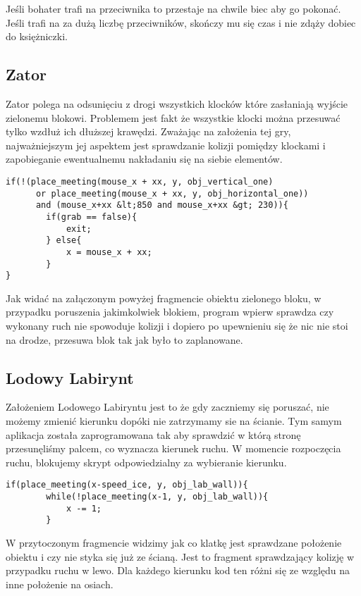 \documentclass[openright]{xmgr}
\begin{document}
Jeśli bohater trafi na przeciwnika to przestaje na chwile biec aby go pokonać. Jeśli trafi na za dużą liczbę przeciwników, skończy mu się czas i nie zdąży dobiec do księżniczki.

\subsection{Zator}
Zator polega na odsunięciu z drogi wszystkich klocków które zasłaniają wyjście zielonemu blokowi. Problemem jest fakt że wszystkie klocki można przesuwać tylko wzdłuż ich dłuższej krawędzi. Zważając na założenia tej gry, najważniejszym jej aspektem jest sprawdzanie kolizji pomiędzy klockami i zapobieganie ewentualnemu nakładaniu się na siebie elementów. 

\begin{lstlisting}[caption={Fragment kodu obiektu obj\_green\_one}]
if(!(place_meeting(mouse_x + xx, y, obj_vertical_one)
      or place_meeting(mouse_x + xx, y, obj_horizontal_one)) 
      and (mouse_x+xx &lt;850 and mouse_x+xx &gt; 230)){
        if(grab == false){
            exit;
        } else{
            x = mouse_x + xx;
        }    
}
\end{lstlisting}

Jak widać na załączonym powyżej fragmencie obiektu zielonego bloku, w przypadku poruszenia jakimkolwiek blokiem, program wpierw sprawdza czy wykonany ruch nie spowoduje kolizji i dopiero po upewnieniu się że nic nie stoi na drodze, przesuwa blok tak jak było to zaplanowane.


\subsection{Lodowy Labirynt}
Założeniem Lodowego Labiryntu jest to że gdy zaczniemy się poruszać, nie możemy zmienić kierunku dopóki nie zatrzymamy sie na ścianie. Tym samym aplikacja została zaprogramowana tak aby sprawdzić w którą stronę przesunęliśmy palcem, co wyznacza kierunek ruchu. W momencie rozpoczęcia ruchu, blokujemy skrypt odpowiedzialny za wybieranie kierunku.

\begin{lstlisting}[caption={Fragment kodu obiektu obj\_player\_ice}]
    if(place_meeting(x-speed_ice, y, obj_lab_wall)){
        while(!place_meeting(x-1, y, obj_lab_wall)){
            x -= 1;
        }
\end{lstlisting}

W przytoczonym fragmencie widzimy jak co klatkę jest sprawdzane położenie obiektu i czy nie styka się już ze ścianą. Jest to fragment sprawdzający kolizję w przypadku ruchu w lewo. Dla każdego kierunku kod ten różni się ze względu na inne położenie na osiach.
\end{document}

